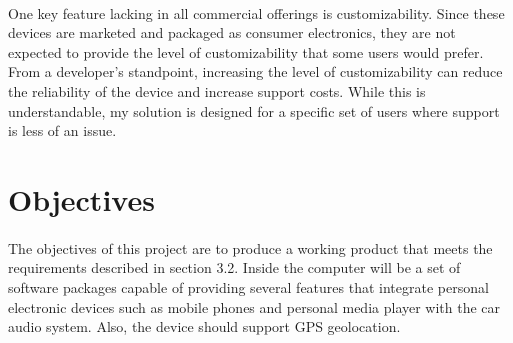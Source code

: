 \paragraph{}
One key feature lacking in all commercial offerings is customizability.
Since these devices are marketed and packaged as consumer electronics, they are not expected to provide the level of customizability that some users would prefer.
From a developer's standpoint, increasing the level of customizability can reduce the reliability of the device and increase support costs.
While this is understandable, my solution is designed for a specific set of users where support is less of an issue.

\section{Objectives}

\paragraph{}
The objectives of this project are to produce a working product that meets the requirements described in section 3.2.
Inside the computer will be a set of software packages capable of providing several features that integrate personal electronic devices such as mobile phones and personal media player with the car audio system.
Also, the device should support GPS geolocation.
